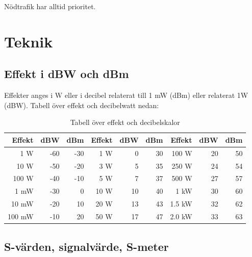 Nödtrafik har alltid prioritet.



\newpage

\section{Teknik}

\subsection{Effekt i dBW och dBm}

Effekter anges i W eller i decibel relaterat till 1 mW (dBm) eller relaterat 1W (dBW). Tabell över effekt och decibelwatt nedan:
\begin{table}[h]
\centering
\begin{tabular}{rrr|rrr|rrr}
	\textbf{Effekt} & \textbf{dBW} & \textbf{dBm} & \textbf{Effekt} & \textbf{dBW} & \textbf{dBm} & \textbf{Effekt} & \textbf{dBW} & \textbf{dBm} \\ \hline
	    1 \textmu W &          -60 &          -30 &             1 W &            0 &           30 &           100 W &           20 &           50 \\
	   10 \textmu W &          -50 &          -20 &             3 W &            5 &           35 &           250 W &           24 &           54 \\
	  100 \textmu W &          -40 &          -10 &             5 W &            7 &           37 &           500 W &           27 &           57 \\
	           1 mW &          -30 &            0 &            10 W &           10 &           40 &            1 kW &           30 &           60 \\
	          10 mW &          -20 &           10 &            20 W &           13 &           43 &          1.5 kW &           32 &           62 \\
	         100 mW &          -10 &           20 &            50 W &           17 &           47 &          2.0 kW &           33 &           63
\end{tabular}
\caption{Tabell över effekt och decibelskalor}
\end{table}

\subsection{S-värden, signalvärde, S-meter}

